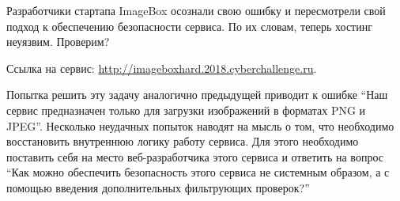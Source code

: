 
Разработчики стартапа ImageBox осознали свою ошибку и пересмотрели свой подход к обеспечению безопасности сервиса. По их словам, теперь хостинг неуязвим. Проверим?

Ссылка на сервис: \url{http://imageboxhard.2018.cyberchallenge.ru}.

\solutionSection

Попытка решить эту задачу аналогично предыдущей приводит к ошибке “Наш сервис предназначен только для загрузки изображений в форматах PNG и JPEG”. Несколько неудачных попыток наводят на мысль о том, что необходимо восстановить внутреннюю логику работу сервиса. Для этого необходимо поставить себя на место веб-разработчика этого сервиса и ответить на вопрос “Как можно обеспечить безопасность этого сервиса не системным образом, а с помощью введения дополнительных фильтрующих проверок?”

